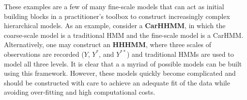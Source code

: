 These examples are a few of many fine-scale models that can act as initial building blocks in a practitioner's toolbox to construct increasingly complex hierarchical models. As an example, consider a \textbf{CarHHMM}, in which the coarse-scale model is a traditional HMM and the fine-scale model is a CarHMM. Alternatively, one may construct an \textbf{HHHMM}, where three scales of observations are recorded ($Y$, $Y^*$, and $Y^{**}$) and traditional HMMs are used to model all three levels. It is clear that a a myriad of possible models can be built using this framework. However, these models quickly become complicated and should be constructed with care to achieve an adequate fit of the data while avoiding over-fitting and high computational costs.